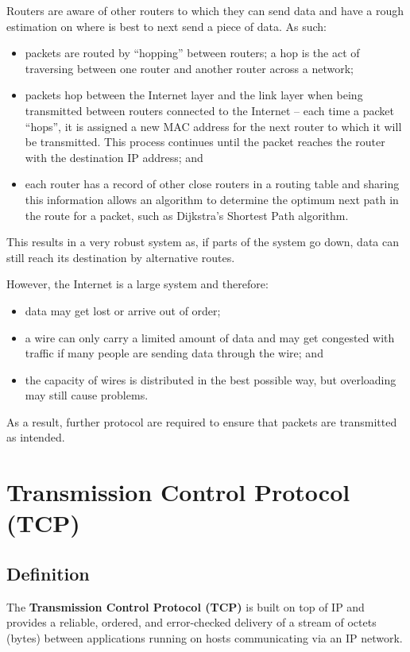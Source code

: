 \documentclass[a4paper]{systems-software}
\begin{document}
Routers are aware of other routers to which they can send data and have a rough estimation on where is best to next send a piece of data. As such:
\begin{itemize}
	\item packets are routed by “hopping” between routers; a hop is the act of traversing between one router and another router across a network;
	\item packets hop between the Internet layer and the link layer when being transmitted between routers connected to the Internet -- each time a packet “hops”, it is assigned a new MAC address for the next router to which it will be transmitted. This process continues until the packet reaches the router with the destination IP address; and
	\item each router has a record of other close routers in a routing table and sharing this information allows an algorithm to determine the optimum next path in the route for a packet, such as Dijkstra’s Shortest Path algorithm.
\end{itemize}

This results in a very robust system as, if parts of the system go down, data can still reach its destination by alternative routes.

However, the Internet is a large system and therefore:
\begin{itemize}
	\item data may get lost or arrive out of order;
	\item a wire can only carry a limited amount of data and may get congested with traffic if many people are sending data through the wire; and
	\item the capacity of wires is distributed in the best possible way, but overloading may still cause problems.
\end{itemize}
As a result, further protocol are required to ensure that packets are transmitted as intended.


\section*{Transmission Control Protocol (TCP)}

\subsection*{Definition}

The \textbf{Transmission Control Protocol (TCP)} is built on top of IP and provides a reliable, ordered, and error-checked delivery of a stream of octets (bytes) between applications running on hosts communicating via an IP network.
\end{document}
